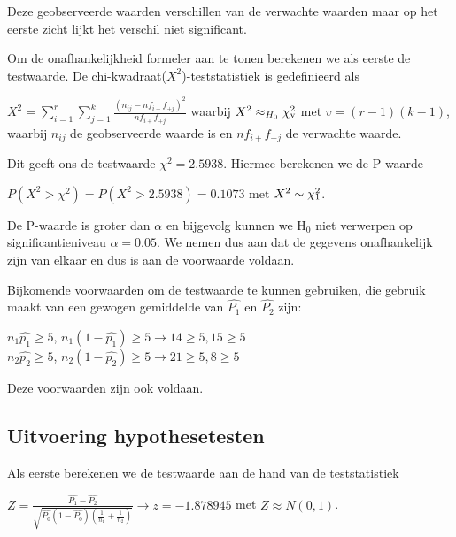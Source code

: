 \documentclass[11pt]{article}
\def\SPSB#1#2{\rlap{\SP{#1}}\SB{#2}}
\def\SP#1{\textsuperscript{#1}}
\def\SB#1{\textsubscript{#1}}
\begin{document}
Deze geobserveerde waarden verschillen van de verwachte waarden maar op het eerste zicht lijkt het verschil niet significant.

Om de onafhankelijkheid formeler aan te tonen berekenen we als eerste de testwaarde. De chi-kwadraat($X^{2}$)-teststatistiek is gedefinieerd als

\begin{center}
$X^{2} = \sum\limits_{i=1}^r \sum\limits_{j=1}^k \frac{(n_{ij}-nf_{i+}f_{+j})^{2}}{nf_{i+}f_{+j}}$ waarbij $X^{2} \approx _{H_{0}} \chi\SPSB{2}{v}$ met $v = (r-1)(k-1)$, \\
waarbij $n_{ij}$ de geobserveerde waarde is en $nf_{i+}f_{+j}$ de verwachte waarde.
\end{center}

Dit geeft ons de testwaarde $\chi^{2}=2.5938$. Hiermee berekenen we de P-waarde

\begin{center}
$P(X^{2}>\chi^{2}) = P(X^2 > 2.5938) = 0.1073$ met $X^2 \sim \chi\SPSB{2}{1}$.
\end{center}

De P-waarde is groter dan $\alpha$ en bijgevolg kunnen we H$_{0}$ niet verwerpen op significantieniveau $\alpha=0.05$. We nemen dus aan dat de gegevens onafhankelijk zijn van elkaar en dus is aan de voorwaarde voldaan.

\newpage

Bijkomende voorwaarden om de testwaarde te kunnen gebruiken, die gebruik maakt van een gewogen gemiddelde van $\hat{P_{1}}$ en $\hat{P_{2}}$ zijn:

\begin{center}
$n_{1}\hat{p_{1}} \geqslant 5$, $n_{1}(1-\hat{p_{1}}) \geqslant 5 \rightarrow 14 \geqslant 5, 15 \geqslant 5$\\
$n_{2}\hat{p_{2}} \geqslant 5$, $n_{2}(1-\hat{p_{2}}) \geqslant 5 \rightarrow 21 \geqslant 5, 8 \geqslant 5$\\
\end{center}

Deze voorwaarden zijn ook voldaan.

\subsection{Uitvoering hypothesetesten}
Als eerste berekenen we de testwaarde aan de hand van de teststatistiek

\begin{center}
$Z = \frac{\hat{P_{1}}-\hat{P_{2}}}{\sqrt{\hat{P_{0}}(1-\hat{P_{0}})\left(\frac{1}{n_{1}}+\frac{1}{n_{2}}\right)}} \rightarrow z = -1.878945$ met $Z \approx N(0,1)$.
\end{center}
\end{document}
